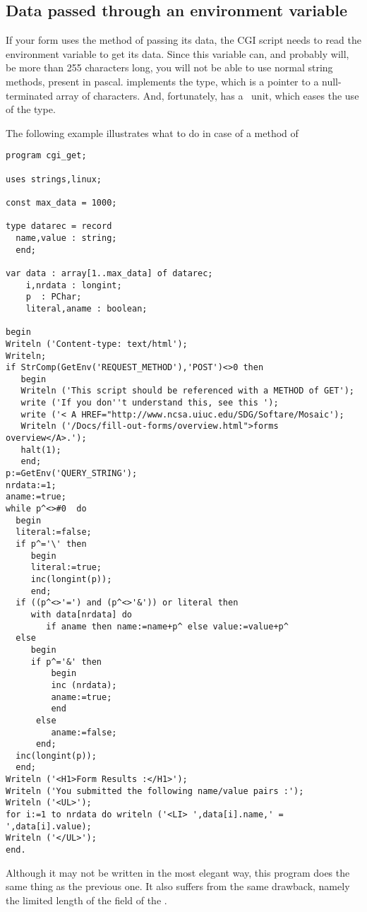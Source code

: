 \subsection{Data passed through an environment variable}
If your form uses the  method of passing its data, the CGI script
needs to read the  environment variable to get its data.
Since this variable can, and probably will, be more than 255 characters long,
you will not be able to use normal string methods, present in pascal. \fpc
implements the  type, which is a pointer to a null-terminated
array of characters.
And, fortunately, \fpc has a
\seestrings\  unit, which eases the use of the
 type.


The following example illustrates what to do in case of a method of 
\begin{verbatim}
program cgi_get;

uses strings,linux;

const max_data = 1000;

type datarec = record
  name,value : string;
  end;

var data : array[1..max_data] of datarec;
    i,nrdata : longint;
    p  : PChar;
    literal,aname : boolean;

begin
Writeln ('Content-type: text/html');
Writeln;
if StrComp(GetEnv('REQUEST_METHOD'),'POST')<>0 then
   begin
   Writeln ('This script should be referenced with a METHOD of GET');
   write ('If you don''t understand this, see this ');
   write ('< A HREF="http://www.ncsa.uiuc.edu/SDG/Softare/Mosaic');
   Writeln ('/Docs/fill-out-forms/overview.html">forms overview</A>.');
   halt(1);
   end;
p:=GetEnv('QUERY_STRING');
nrdata:=1;
aname:=true;
while p^<>#0  do
  begin
  literal:=false;
  if p^='\' then
     begin
     literal:=true;
     inc(longint(p));
     end;
  if ((p^<>'=') and (p^<>'&')) or literal then
     with data[nrdata] do
        if aname then name:=name+p^ else value:=value+p^
  else
     begin
     if p^='&' then
         begin
         inc (nrdata);
         aname:=true;
         end
      else
         aname:=false;
      end;
  inc(longint(p));
  end;
Writeln ('<H1>Form Results :</H1>');
Writeln ('You submitted the following name/value pairs :');
Writeln ('<UL>');
for i:=1 to nrdata do writeln ('<LI> ',data[i].name,' = ',data[i].value);
Writeln ('</UL>');
end.
\end{verbatim}
Although it may not be written in the most elegant way, this program does
the same thing as the previous one. It also suffers from the same drawback,
namely the limited length of the  field of the .

